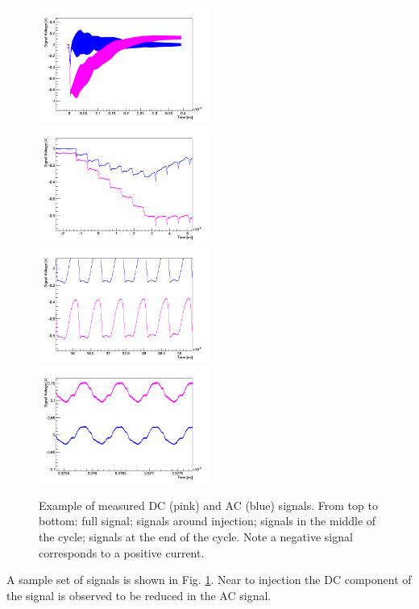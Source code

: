 \documentclass{paper}
\begin{document}
\begin{figure}
		\includegraphics[width=0.5\textwidth]{images/v=7_18_signal_full}
		\includegraphics[width=0.5\textwidth]{images/v=7_18_signal_injection}
		\includegraphics[width=0.5\textwidth]{images/v=7_18_signal_middle}
		\includegraphics[width=0.5\textwidth]{images/v=7_18_signal_end}
	\caption{Example of measured DC (pink) and AC (blue) signals. From top to 
           bottom: full signal; signals around injection; signals in the middle
           of the cycle; signals at the end of the cycle. Note a negative signal
           corresponds to a positive current.}
	\label{fig:bm_signals}
\end{figure}

A sample set of signals is shown in Fig. \ref{fig:bm_signals}. Near to injection the
DC component of the signal is observed to be reduced in the AC signal. 
\end{document}
